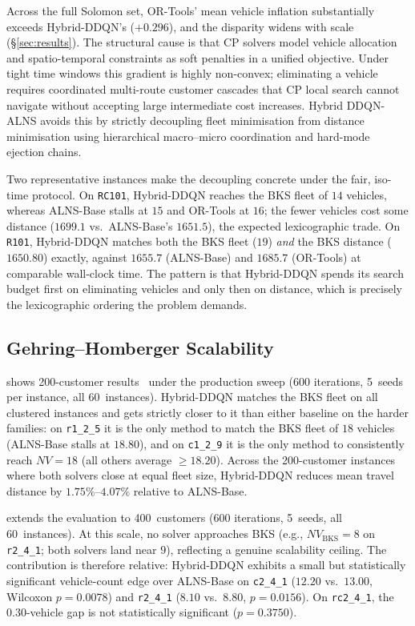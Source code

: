 \documentclass[journal]{IEEEtran}
\newcommand{\BKS}{\text{BKS}}
\begin{document}
Across the full Solomon set, OR-Tools' mean vehicle inflation substantially
exceeds Hybrid-DDQN's ($+0.296$), and the disparity widens with scale
(\S\ref{sec:results}). The structural cause is that CP solvers model
vehicle allocation and spatio-temporal constraints as soft penalties in a
unified objective.  Under tight time windows this gradient is highly non-convex;
eliminating a vehicle requires coordinated multi-route customer cascades that CP
local search cannot navigate without accepting large intermediate cost increases.
Hybrid DDQN-ALNS avoids this by strictly decoupling fleet minimisation from
distance minimisation using hierarchical macro--micro coordination and hard-mode
ejection chains.

Two representative instances make the decoupling concrete under the fair,
iso-time protocol. On \texttt{RC101}, Hybrid-DDQN reaches the BKS fleet of $14$
vehicles, whereas ALNS-Base stalls at $15$ and OR-Tools at $16$; the fewer
vehicles cost some distance ($1699.1$ vs.\ ALNS-Base's $1651.5$), the expected
lexicographic trade. On \texttt{R101}, Hybrid-DDQN matches both the BKS fleet
($19$) \emph{and} the BKS distance ($1650.80$) exactly, against $1655.7$
(ALNS-Base) and $1685.7$ (OR-Tools) at comparable wall-clock time. The pattern is
that Hybrid-DDQN spends its search budget first on eliminating vehicles and only
then on distance, which is precisely the lexicographic ordering the problem
demands.

\subsection{Gehring--Homberger Scalability}

 shows 200-customer results~\cite{Gehring1999} under the
production sweep (600 iterations, 5~seeds per instance, all 60~instances).
Hybrid-DDQN matches the BKS fleet on all clustered instances and
gets strictly closer to it than either baseline on the harder families: on
\texttt{r1\_2\_5} it is the only method to match the BKS fleet of $18$ vehicles
(ALNS-Base stalls at $18.80$), and on \texttt{c1\_2\_9} it is the only method
to consistently reach $NV{=}18$ (all others average $\ge 18.20$).
Across the 200-customer instances where both solvers close at equal fleet size,
Hybrid-DDQN reduces mean travel distance by $1.75\%$--$4.07\%$ relative to
ALNS-Base.

 extends the evaluation to 400~customers (600 iterations,
5~seeds, all 60~instances).  At this scale, no solver approaches BKS (e.g.,
$NV_{\BKS}{=}8$ on \texttt{r2\_4\_1}; both solvers land near $9$), reflecting a
genuine scalability ceiling.  The contribution is therefore relative:
Hybrid-DDQN exhibits a small but statistically significant vehicle-count edge
over ALNS-Base on \texttt{c2\_4\_1} ($12.20$ vs.\ $13.00$, Wilcoxon
$p{=}0.0078$) and \texttt{r2\_4\_1} ($8.10$ vs.\ $8.80$, $p{=}0.0156$).
On \texttt{rc2\_4\_1}, the $0.30$-vehicle gap is not statistically
significant ($p{=}0.3750$).
\end{document}
